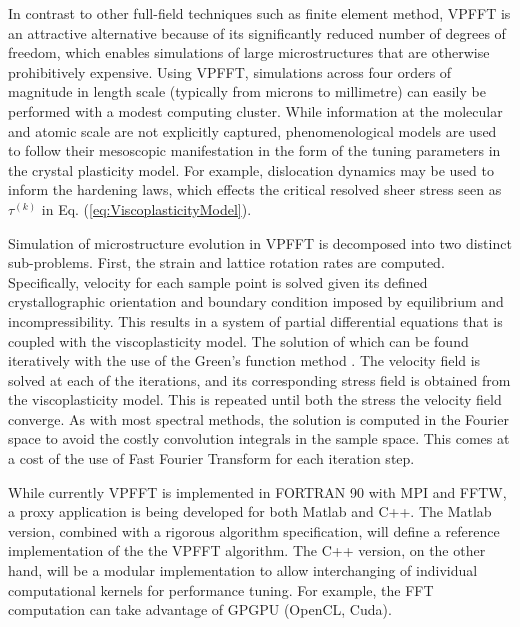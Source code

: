 \documentclass[11pt]{article}
\newcommand{\RefEq}[1] {Eq. (\ref{#1})}
\begin{document}
In contrast to other full-field techniques such as finite element method, VPFFT is an attractive alternative because of its significantly reduced number of degrees of freedom, which enables simulations of large microstructures that are otherwise prohibitively expensive.  Using VPFFT, simulations across four orders of magnitude in length scale  (typically from microns to millimetre) can easily be performed with a modest computing cluster.  While information at the molecular and atomic scale are not explicitly captured, phenomenological models are used to follow their mesoscopic manifestation in the form of the tuning parameters in the crystal plasticity model.  For example, dislocation dynamics may be used to inform the hardening laws, which effects the critical resolved sheer stress seen as $\tau^{(k)}$ in \RefEq{eq:ViscoplasticityModel}.


Simulation of microstructure evolution in VPFFT is decomposed into two distinct sub-problems.  First, the strain and lattice rotation rates are computed.  Specifically, velocity for each sample point is solved given its defined crystallographic orientation and boundary condition imposed by equilibrium and incompressibility.  This results in a system of partial differential equations that is coupled with the viscoplasticity model.  The solution of which can be found iteratively with the use of the Green’s function method \cite{Moulinec199869}.  The velocity field is solved at each of the iterations, and its corresponding stress field is obtained from the viscoplasticity model.  This is repeated until both the stress the velocity field converge.  As with most spectral methods, the solution is computed in the Fourier space to avoid the costly convolution integrals in the sample space.  This comes at a cost of the use of Fast Fourier Transform for each iteration step.


While currently VPFFT is implemented in FORTRAN 90 with MPI and FFTW, a proxy application is being developed for both Matlab and C++.  The Matlab version, combined with a rigorous algorithm specification, will define a reference implementation of the the VPFFT algorithm.  The C++ version, on the other hand, will be a modular implementation to allow interchanging of individual computational kernels for performance tuning.  For example, the FFT computation can take advantage of GPGPU (OpenCL, Cuda).






\end{document}
